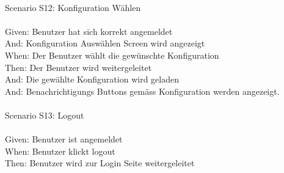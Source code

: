 \begin{tabbing}
    \\
    Scenario S12: \> \>  Konfiguration Wählen\\ \\
    Given: \> \>  Benutzer hat sich korrekt angemeldet\\
    And: \> \>    Konfiguration Auswählen Screen wird angezeigt\\
    When: \> \>   Der Benutzer wählt die gewünschte Konfiguration\\
    Then: \> \>   Der Benutzer wird weitergeleitet\\
    And: \> \>    Die gewählte Konfiguration wird geladen\\
    And: \> \>    Benachrichtigungs Buttons gemäss Konfiguration werden angezeigt.\\ \\


    Scenario S13:  \> \> Logout\\ \\
    Given: \> \>  Benutzer ist angemeldet\\
    When: \> \>   Benutzer klickt logout\\
    Then: \> \>  Benutzer wird zur Login Seite weitergeleitet\\
\end{tabbing}

\clearpage

